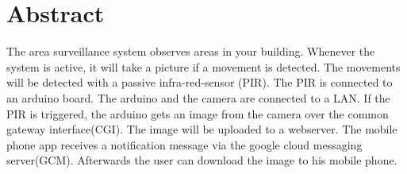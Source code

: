 \section*{Abstract}
The area surveillance system observes areas in your building. Whenever the system is active, it will take a picture if a movement is detected. The movements will be detected with a passive infra-red-sensor (PIR). The PIR is connected to an arduino board. The arduino and the camera are connected to a LAN. If the PIR is triggered, the arduino gets an image from the camera over the common gateway interface(CGI). The image will be uploaded to a webserver. The mobile phone app receives a notification message via the google cloud messaging server(GCM). Afterwards the user can download the image to his mobile phone.
